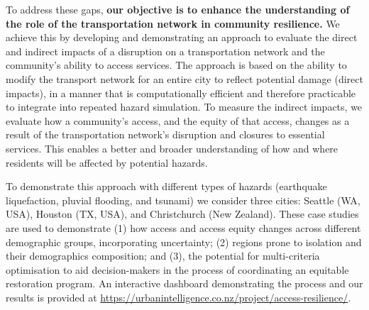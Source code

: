 \documentclass[review,3p,times,onecolumn,sort&compress,12pt]{elsarticle}
\begin{document}
To address these gaps, \textbf{our objective is to enhance the understanding of the role of the transportation network in community resilience.} 
We achieve this by developing and demonstrating an approach to evaluate the direct and indirect impacts of a disruption on a transportation network and the community's ability to access services.
The approach is based on the ability to modify the transport network for an entire city to reflect potential damage (direct impacts), in a manner that is computationally efficient and therefore practicable to integrate into repeated hazard simulation.
To measure the indirect impacts, we evaluate how a community's access, and the equity of that access, changes as a result of the transportation network's disruption and closures to essential services.
This enables a better and broader understanding of how and where residents will be affected by potential hazards.

To demonstrate this approach with different types of hazards (earthquake liquefaction, pluvial flooding, and tsunami) we consider three cities: Seattle (WA, USA), Houston (TX, USA), and Christchurch (New Zealand).
These case studies are used to demonstrate (1) how access and access equity changes across different demographic groups, incorporating uncertainty; (2) regions prone to isolation and their demographics composition; and (3), the potential for multi-criteria optimisation to aid decision-makers in the process of coordinating an equitable restoration program.
An interactive dashboard demonstrating the process and our results is provided at \url{https://urbanintelligence.co.nz/project/access-resilience/}.


\end{document}
